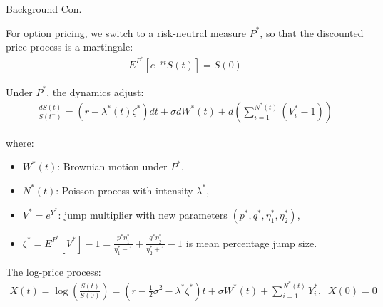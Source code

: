 \documentclass{beamer}
\begin{document}
\begin{frame}{Background Con.}

    {\footnotesize \footnotesize
    \par For option pricing, we switch to a risk-neutral measure \( P^* \), so that the discounted price process is a martingale:
    \begin{align*}
        E^{P^*}[e^{-rt}S(t)] = S(0)
    \end{align*}
    \par Under \( P^* \), the dynamics adjust:
    \begin{align*}
        \frac{dS(t)}{S(t^-)} = (r - \lambda^*(t)\zeta^*)dt + \sigma dW^*(t) + d\left(\sum_{i=1}^{N^*(t)}(V_i^*-1)\right)
    \end{align*}
    \par \pause where:
    \begin{itemize}
        \item \( W^*(t) \): Brownian motion under \( P^* \),
        \item \( N^*(t) \): Poisson process with intensity \( \lambda^* \),
        \item \( V^* = e^{Y^*} \): jump multiplier with new parameters \( (p^*, q^*, \eta_1^*, \eta_2^*) \),
        \item \( \zeta^* = E^{P^*}[V^*] - 1 = \frac{p^{*}\eta_{1}^{*}}{\eta_{1}^{*}-1} + \frac{q^{*}\eta_{2}^{*}}{\eta_{2}^{*}+1} - 1\) is mean percentage jump size.
    \end{itemize}
    \par The log-price process:  
    \begin{align*}
        X(t) = \log\left(\frac{S(t)}{S(0)}\right) = \left(r - \frac{1}{2}\sigma^2 - 
    \lambda^*\zeta^*\right)t + \sigma W^*(t) + \sum_{i=1}^{N^*(t)} Y_i^*,\;\;X(0)=0
    \end{align*}
    }
\end{frame}
\end{document}

